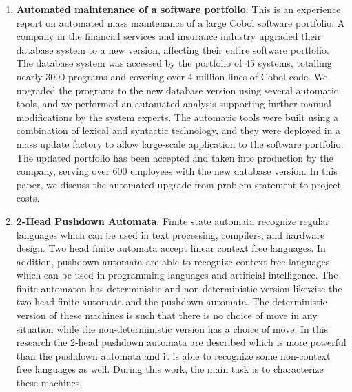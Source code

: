 \begin{englishtext}
\begin{enumerate}
    \item \textbf{Automated maintenance of a software portfolio}: This is an
    experience report on automated mass maintenance of a large Cobol software
    portfolio. A company in the financial services and insurance industry
    upgraded their database system to a new version, affecting their entire
    software portfolio. The database system was accessed by the portfolio of 45
    systems, totalling nearly 3000 programs and covering over 4 million lines of
    Cobol code. We upgraded the programs to the new database version using
    several automatic tools, and we performed an automated analysis supporting
    further manual modifications by the system experts. The automatic tools were
    built using a combination of lexical and syntactic technology, and they were
    deployed in a mass update factory to allow large-scale application to the
    software portfolio. The updated portfolio has been accepted and taken into
    production by the company, serving over 600 employees with the new database
    version. In this paper, we discuss the automated upgrade from problem
    statement to project costs. \cite{softwarePortfolio}

    \item \textbf{2-Head Pushdown Automata}: Finite state automata recognize
    regular languages which can be used in text processing, compilers, and
    hardware design. Two head finite automata accept linear context free
    languages. In addition, pushdown automata are able to recognize context free
    languages which can be used in programming languages and artificial
    intelligence. The finite automaton has deterministic and non-deterministic
    version likewise the two head finite automata and the pushdown automata. The
    deterministic version of these machines is such that there is no choice of
    move in any situation while the non-deterministic version has a choice of
    move. In this research the 2-head pushdown automata are described which is
    more powerful than the pushdown automata and it is able to recognize some
    non-context free languages as well. During this work, the main task is to
    characterize these machines. \cite{pushdownAutomata}


\end{enumerate}
\end{englishtext}
